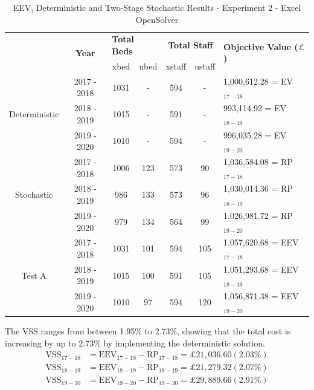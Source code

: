 \documentclass[../thesis.tex]{subfiles}
\begin{document}
\begin{table}
    \centering
    \begin{tabular}{ccccccl}\toprule
 & \multirow{2}{*}{\textbf{Year}}& \multicolumn{2}{l}{\textbf{Total Beds}} & \multicolumn{2}{c}{\textbf{Total Staff}} & \multirow{2}{*}{\textbf{Objective Value ($\pounds$)}}\\ \cmidrule(lr){3-4} \cmidrule(lr){5-6}
&& xbed           & ubed          & xstaff         & ustaff         \\ \midrule
     \multirow{3}{*}{Deterministic} & 2017 - 2018 & 1031 & - &  594 & - & 1,000,612.28 =  EV$_{17-18}$ \\ 
      & 2018 - 2019 & 1015 & - & 591 & - & 993,114.92 =  EV$_{18-19}$ \\
      & 2019 - 2020 & 1010 & - & 594 & - & 996,035.28 =  EV$_{19-20}$\\ \midrule
     \multirow{3}{*}{Stochastic} & 2017 - 2018 & 1006 & 123 & 573 & 90 & 1,036,584.08 =  RP$_{17-18}$ \\ 
      & 2018 - 2019 & 986 & 133 & 573 & 96 & 1,030,014.36 =  RP$_{18-19}$ \\
      & 2019 - 2020 & 979 & 134 & 564 & 99 & 1,026,981.72 =  RP$_{19-20}$\\ \midrule    
     \multirow{3}{*}{Test A} & 2017 - 2018 & 1031 & 101 & 594 & 105 & 1,057,620.68 =  EEV$_{17-18}$ \\ 
      & 2018 - 2019 & 1015 & 100 & 591 & 105 &  1,051,293.68 =  EEV$_{18-19}$ \\
      & 2019 - 2020 & 1010 & 97 & 594 & 120 & 1,056,871.38 =  EEV$_{19-20}$\\ \bottomrule       
    \end{tabular}
    \caption{EEV, Deterministic and Two-Stage Stochastic Results - Experiment 2 - Excel OpenSolver}
    \label{tab:eevdetstocresults2}
\end{table}

The VSS ranges from between 1.95\% to 2.73\%, showing that the total cost is increasing by up to 2.73\% by implementing the deterministic solution.
\begin{align}
    \text{VSS}_{17-18} &= \text{EEV}_{17-18} - \text{RP}_{17-18} = \pounds21,03 6.60 (2.03\%)  \\
    \text{VSS}_{18-19} &= \text{EEV}_{18-19} - \text{RP}_{18-19} = \pounds21,279.32 (2.07\%)  \\
    \text{VSS}_{19-20} &= \text{EEV}_{19-20} - \text{RP}_{19-20} = \pounds29,889.66 (2.91\%)  
\end{align}
\end{document}
